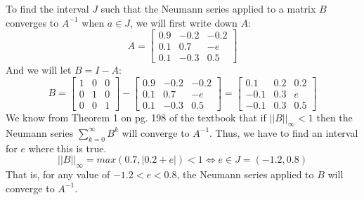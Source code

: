 To find the interval $J$ such that the Neumann series applied to a matrix $B$ converges to $A^{-1}$ when $a \in J$, we will first write down $A$:
$$
A =
\begin{bmatrix}
  0.9 & -0.2 & -0.2 \\
  0.1 & 0.7  & -e   \\
  0.1 & -0.3 & 0.5
\end{bmatrix}
$$
And we will let $B = I - A$:
$$
B =
\begin{bmatrix}
  1 & 0 & 0 \\
  0 & 1 & 0 \\
  0 & 0 & 1
\end{bmatrix}
-
\begin{bmatrix}
  0.9 & -0.2 & -0.2 \\
  0.1 & 0.7  & -e   \\
  0.1 & -0.3 & 0.5
\end{bmatrix}
=
\begin{bmatrix}
  0.1  & 0.2 & 0.2 \\
  -0.1 & 0.3 & e   \\
  -0.1 & 0.3 & 0.5
\end{bmatrix}
$$
We know from Theorem 1 on pg. 198 of the textbook that if $||B||_\infty < 1$ then the Neumann series $\sum_{k=0}^\infty B^k$ will converge to $A^{-1}$. Thus, we have to find an interval for $e$ where this is true.
$$
||B||_\infty = max(0.7,|0.2+e|) < 1 \iff e \in J = (-1.2,0.8)
$$
That is, for any value of $-1.2 < e < 0.8$, the Neumann series applied to $B$ will converge to $A^{-1}$.
